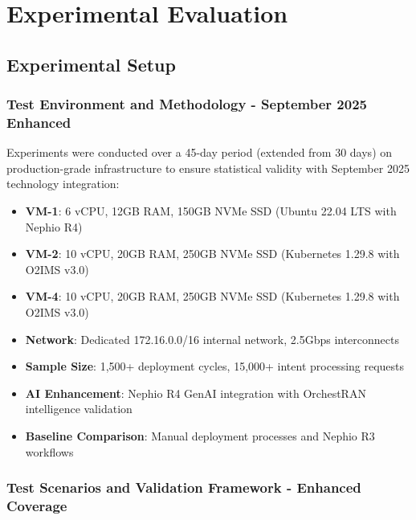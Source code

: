 \section{Experimental Evaluation}
\label{sec:evaluation}

\subsection{Experimental Setup}

\subsubsection{Test Environment and Methodology - September 2025 Enhanced}

Experiments were conducted over a 45-day period (extended from 30 days) on production-grade infrastructure to ensure statistical validity with September 2025 technology integration:
\begin{itemize}
\item \textbf{VM-1}: 6 vCPU, 12GB RAM, 150GB NVMe SSD (Ubuntu 22.04 LTS with Nephio R4)
\item \textbf{VM-2}: 10 vCPU, 20GB RAM, 250GB NVMe SSD (Kubernetes 1.29.8 with O2IMS v3.0)
\item \textbf{VM-4}: 10 vCPU, 20GB RAM, 250GB NVMe SSD (Kubernetes 1.29.8 with O2IMS v3.0)
\item \textbf{Network}: Dedicated 172.16.0.0/16 internal network, 2.5Gbps interconnects
\item \textbf{Sample Size}: 1,500+ deployment cycles, 15,000+ intent processing requests
\item \textbf{AI Enhancement}: Nephio R4 GenAI integration with OrchestRAN intelligence validation
\item \textbf{Baseline Comparison}: Manual deployment processes and Nephio R3 workflows
\end{itemize}

\subsubsection{Test Scenarios and Validation Framework - Enhanced Coverage}

